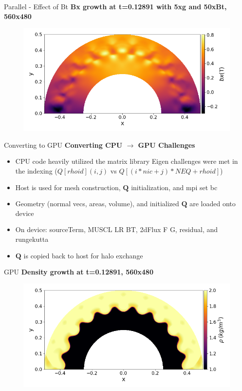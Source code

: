 \begin{frame}[t]{Parallel - Effect of Bt}
  \textbf{Bx growth at t=0.12891 with 5xg and 50xBt, 560x480}
 \begin{figure}[!htbp]
   \includegraphics[width=0.85\linewidth]{fig/560x480cpuBx5_bx}
   \centering
 \end{figure}
\end{frame}



\begin{frame}[t]{Converting to GPU}
  \textbf{Converting CPU $\rightarrow$ GPU Challenges}
  \begin{itemize}
    \item CPU code heavily utilized the matrix library Eigen challenges were met in the indexing ($Q[rhoid](i,j)$ vs $Q[(i*nic+j)*NEQ+rhoid]$)
    \item Host is used for mesh construction, $\mathbf{Q}$ initialization, and mpi set bc
    \item Geometry (normal vecs, areas, volume), and initialized $\mathbf{Q}$ are loaded onto device
    \item On device: sourceTerm, MUSCL LR BT, 2dFlux F G, residual, and rungekutta
    \item $\mathbf{Q}$ is copied back to host for halo exchange
  \end{itemize}

\end{frame}


\begin{frame}[t]{GPU}
  \textbf{Density growth at t=0.12891, 560x480}
 \begin{figure}[!htbp]
   \includegraphics[width=0.85\linewidth]{fig/560x480gpu}
   \centering
 \end{figure}
\end{frame}




